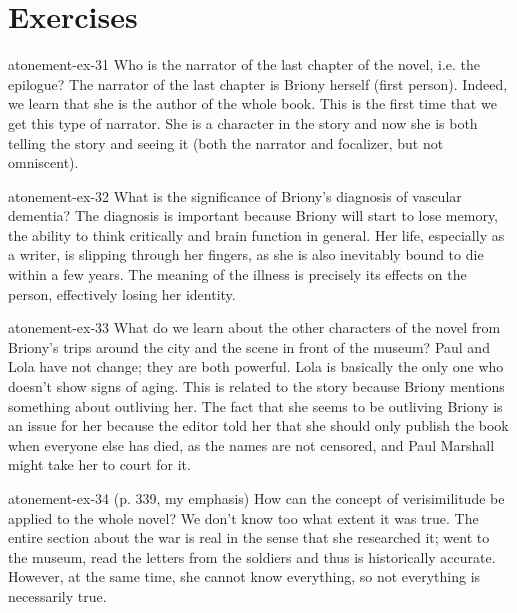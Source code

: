 \documentclass[preview]{standalone}
\begin{document}
\genpage

\section{Exercises}

\begin{snippetexercise}{atonement-ex-31}
    {Who is the narrator of the last chapter of the novel, i.e. the epilogue?}
    The narrator of the last chapter is Briony herself (first person).
    Indeed, we learn that she is the author of the whole book.
    This is the first time that we get this type of narrator.
    She is a character in the story and now she is both telling the story and seeing it
    (both the narrator and focalizer, but not omniscent).
\end{snippetexercise}

\begin{snippetexercise}{atonement-ex-32}
    {What is the significance of Briony's diagnosis of vascular dementia?}
    The diagnosis is important because Briony will start to lose memory, the ability to
    think critically and brain function in general. Her life,
    especially as a writer, is slipping through her fingers,
    as she is also inevitably bound to die within a few years.
    The meaning of the illness is precisely its effects on the person,
    effectively losing her identity.
\end{snippetexercise}

\begin{snippetexercise}{atonement-ex-33}
    {What do we learn about the other characters of the novel from Briony's trips around the city and
    the scene in front of the museum?}
    Paul and Lola have not change; they are both powerful.
    Lola is basically the only one who doesn't show signs of aging.
    This is related to the story because Briony mentions something about outliving her.
    The fact that she seems to be outliving Briony is an issue for her because
    the editor told her that she should only publish the book when everyone else has died,
    as the names are not censored, and Paul Marshall might take her to court for it.
\end{snippetexercise}

\begin{snippetexercise}{atonement-ex-34}
    { (p. 339, my emphasis) How can the concept of verisimilitude
    be applied to the whole novel?}
    We don't know too what extent it was true.
    The entire section about the war is real in the sense that she researched it;
    went to the museum, read the letters from the soldiers and thus is historically accurate.
    However, at the same time, she cannot know everything, so not everything is necessarily true.
\end{snippetexercise}
\end{document}

